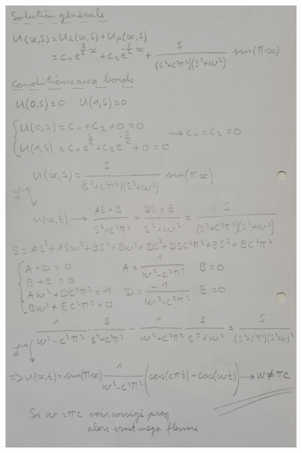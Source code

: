 \begin{figure}[H]
    \centering
    \includegraphics[height=\textheight, width=\columnwidth]{images/semaine7_exemple_laplace5.jpg}
\end{figure}
